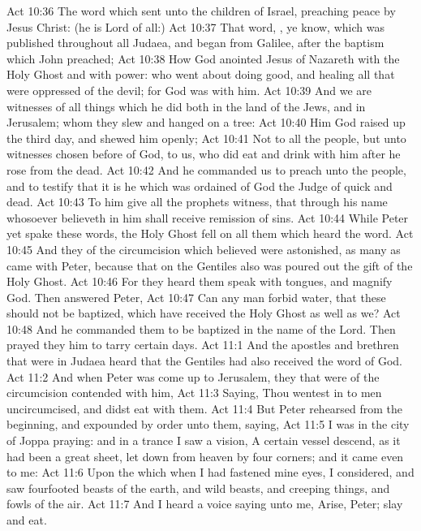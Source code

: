 \vs Act 10:36 The word which  sent unto the children of Israel, preaching peace by Jesus Christ: (he is Lord of all:)
\vs Act 10:37 That word, , ye know, which was published throughout all Judaea, and began from Galilee, after the baptism which John preached;
\vs Act 10:38 How God anointed Jesus of Nazareth with the Holy Ghost and with power: who went about doing good, and healing all that were oppressed of the devil; for God was with him.
\vs Act 10:39 And we are witnesses of all things which he did both in the land of the Jews, and in Jerusalem; whom they slew and hanged on a tree:
\vs Act 10:40 Him God raised up the third day, and shewed him openly;
\vs Act 10:41 Not to all the people, but unto witnesses chosen before of God,  to us, who did eat and drink with him after he rose from the dead.
\vs Act 10:42 And he commanded us to preach unto the people, and to testify that it is he which was ordained of God  the Judge of quick and dead.
\vs Act 10:43 To him give all the prophets witness, that through his name whosoever believeth in him shall receive remission of sins.
\vs Act 10:44 While Peter yet spake these words, the Holy Ghost fell on all them which heard the word.
\vs Act 10:45 And they of the circumcision which believed were astonished, as many as came with Peter, because that on the Gentiles also was poured out the gift of the Holy Ghost.
\vs Act 10:46 For they heard them speak with tongues, and magnify God. Then answered Peter,
\vs Act 10:47 Can any man forbid water, that these should not be baptized, which have received the Holy Ghost as well as we?
\vs Act 10:48 And he commanded them to be baptized in the name of the Lord. Then prayed they him to tarry certain days.
\vs Act 11:1 And the apostles and brethren that were in Judaea heard that the Gentiles had also received the word of God.
\vs Act 11:2 And when Peter was come up to Jerusalem, they that were of the circumcision contended with him,
\vs Act 11:3 Saying, Thou wentest in to men uncircumcised, and didst eat with them.
\vs Act 11:4 But Peter rehearsed  from the beginning, and expounded  by order unto them, saying,
\vs Act 11:5 I was in the city of Joppa praying: and in a trance I saw a vision, A certain vessel descend, as it had been a great sheet, let down from heaven by four corners; and it came even to me:
\vs Act 11:6 Upon the which when I had fastened mine eyes, I considered, and saw fourfooted beasts of the earth, and wild beasts, and creeping things, and fowls of the air.
\vs Act 11:7 And I heard a voice saying unto me, Arise, Peter; slay and eat.
